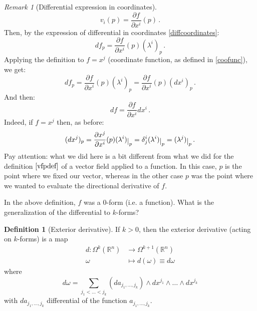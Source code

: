 \documentclass[a4paper,11pt,titlepage, article, oneside]{memoir}
\numberwithin{equation}{section}
\theoremstyle{definition}
\newtheorem{definition}[theorem]{Definition}
\theoremstyle{remark}
\newtheorem{remark}[theorem]{Remark}
\newcommand{\rfield}{\mathbb{R}}
\newcommand{\restrict}[2]{{#1}\raisebox{-.5ex}{$|$}_{#2}}
\begin{document}
\begin{remarkbox}
\begin{remark}[Differential expression in coordinates]
\begin{equation}
     v_i (p) = \frac{\partial f}{\partial x^i} (p) \, .
   \end{equation}
   Then, by the expression of differential in coordinates \eqref{diffcoordinates}:
   \begin{equation}
     df_p = \frac{\partial f}{\partial x^i} (p) (\lambda^i)_p\, .
   \end{equation}
   Applying the definition to $f = x^j$ (coordinate function, as defined in \eqref{coofunc}), we get:
   \begin{equation}
     df_p = \frac{\partial f}{\partial x^i} (p) (\lambda^i)_p = \frac{\partial f}{\partial x^i} (p) (dx^i)_p \, .
   \end{equation}
   And then:
   \begin{equation}
     df = \frac{\partial f}{\partial x^i} dx^i\, .
   \end{equation}
   Indeed, if $f = x^j$ then, as before:
   \begin{equation}
     (dx^j)_p = \frac{\partial x^j}{\partial x^i} (p) \restrict{(\lambda^i)}{p} = \delta^i_j \restrict{(\lambda^i)}{p} = \restrict{(\lambda^j)}{p} \, .
   \end{equation}
Pay attention: what we did here is a bit different from what we did for the definition $\ref{vfpdef}$ of a vector field applied to a function. In this case, $p$ is the point where we fixed our vector, whereas in the other case $p$ was the point where we wanted to evaluate the directional derivative of $f$.
\end{remark}\end{remarkbox}

In the above definition, $f$ was a 0-form (i.e. a function). What is the generalization of the differential to $k$-forms?

\begin{definition}[Exterior derivative] \label{extder}
  If $k > 0$, then the exterior derivative (acting on $k$-forms) is a map
  \begin{align*}
    d \colon \Omega^k(\rfield^n) & \rightarrow \Omega^{k+1}(\rfield^n) \\
    \omega &\mapsto d (\omega) \equiv d \omega
  \end{align*}
  where
  \begin{equation*}
    d \omega = \sum\limits_{j_1 < \ldots < j_k} \left (d a_{j_1, \ldots, j_k} \right) \wedge dx^{j_1} \wedge \ldots \wedge dx^{j_k}
  \end{equation*}
with $d a_{j_1, \ldots, j_k}$ differential of the function $a_{j_1, \ldots, j_k}$.
\end{definition}
\end{document}
